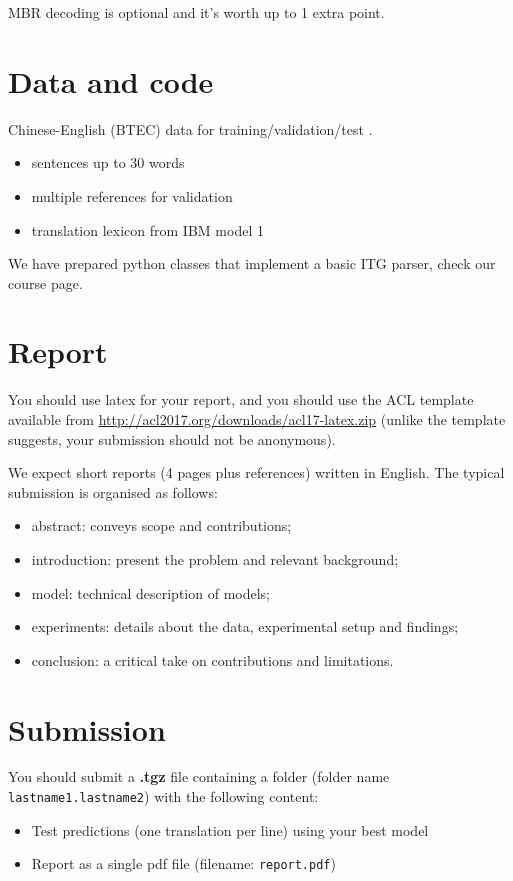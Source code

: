 MBR decoding is optional and it's worth up to 1 extra point.

\section{Data and code}

Chinese-English (BTEC) data for training/validation/test \citep{Takezawa+2002:BTEC}.
\begin{itemize}
	\item sentences up to 30 words
	\item multiple references for validation
	\item translation lexicon from IBM model 1
\end{itemize}

We have prepared python classes that implement a basic ITG parser, check our course page.


\section{Report}

You should use latex for your report, and you should use the ACL template available from \url{http://acl2017.org/downloads/acl17-latex.zip} (unlike the template suggests, your submission should not be anonymous). 

We expect short reports (4 pages plus references) written in English. The typical submission is organised as follows: 
\begin{itemize}
	\item abstract: conveys scope and contributions;
	\item introduction: present the problem and relevant background;
	\item model: technical description of models;
	\item experiments: details about the data, experimental setup and findings;
	\item conclusion: a critical take on contributions and limitations.
\end{itemize}


\section{Submission}

You should submit a \textbf{.tgz} file containing a folder (folder name {\tt lastname1.lastname2}) with the following content: 
\begin{itemize}
	\item Test predictions (one translation per line) using your best model
	\item Report as a single pdf file (filename: {\tt report.pdf})
\end{itemize}

